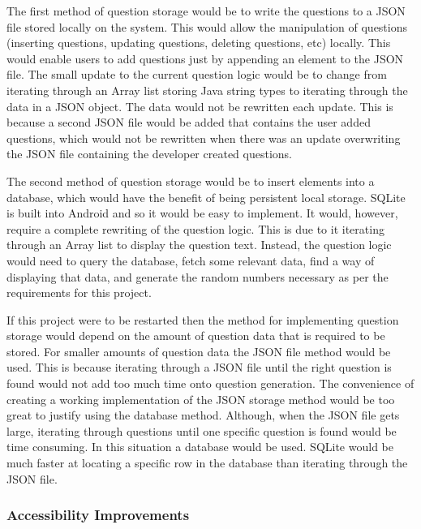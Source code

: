 \documentclass{article}
\begin{document}
The first method of question storage would be to write the questions to a JSON file stored locally on the system. This would allow the manipulation of questions (inserting questions, updating questions, deleting questions, etc) locally. This would enable users to add questions just by appending an element to the JSON file. The small update to the current question logic would be to change from iterating through an Array list storing Java string types to iterating through the data in a JSON object. The data would not be rewritten each update. This is because a second JSON file would be added that contains the user added questions, which would not be rewritten when there was an update overwriting the JSON file containing the developer created questions. \par

The second method of question storage would be to insert elements into a database, which would have the benefit of being persistent local storage. SQLite is built into Android and so it would be easy to implement. It would, however, require a complete rewriting of the question logic. This is due to it iterating through an Array list to display the question text. Instead, the question logic would need to query the database, fetch some relevant data, find a way of displaying that data, and generate the random numbers necessary as per the requirements for this project. \par

If this project were to be restarted then the method for implementing question storage would depend on the amount of question data that is required to be stored. For smaller amounts of question data the JSON file method would be used. This is because iterating through a JSON file until the right question is found would not add too much time onto question generation. The convenience of creating a working implementation of the JSON storage method would be too great to justify using the database method. Although, when the JSON file gets large, iterating through questions until one specific question is found would be time consuming. In this situation a database would be used. SQLite would be much faster at locating a specific row in the database than iterating through the JSON file. \par

\subsubsection{Accessibility Improvements}
\end{document}

